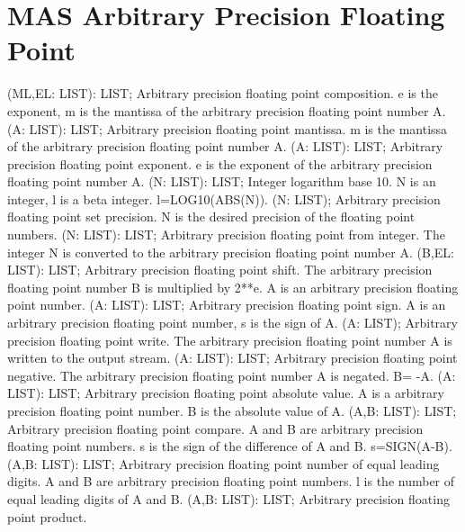 \section{ MAS Arbitrary Precision Floating Point  } 
 (ML,EL: LIST): LIST; \eproc
\bcom Arbitrary precision floating point composition. e is the
exponent, m is the mantissa of the arbitrary precision
floating point number A. \ecom 
{} (A: LIST): LIST; \eproc
\bcom Arbitrary precision floating point mantissa. m is the mantissa
of the arbitrary precision floating point number A. \ecom 
{} (A: LIST): LIST; \eproc
\bcom Arbitrary precision floating point exponent. e is the
exponent of the arbitrary precision floating point number A. \ecom 
{} (N: LIST): LIST; \eproc
\bcom Integer logarithm base 10.
N is an integer, l is a beta integer. l=LOG10(ABS(N)). \ecom 
{} (N: LIST); \eproc
\bcom Arbitrary precision floating point set precision.
N is the desired precision of the floating point numbers. \ecom 
{} (N: LIST): LIST; \eproc
\bcom Arbitrary precision floating point from integer.
The integer N is converted to the arbitrary precision
floating point number A. \ecom 
{} (B,EL: LIST): LIST; \eproc
\bcom Arbitrary precision floating point shift.
The arbitrary precision floating point number B is multiplied by 2**e.
A is an arbitrary precision floating point number. \ecom 
{} (A: LIST): LIST; \eproc
\bcom Arbitrary precision floating point sign. A is an arbitrary precision
floating point number, s is the sign of A. \ecom 
{} (A: LIST); \eproc
\bcom Arbitrary precision floating point write.
The arbitrary precision floating point number A is written to
the output stream. \ecom 
{} (A: LIST): LIST; \eproc
\bcom Arbitrary precision floating point negative.
The arbitrary precision floating point number A is negated.
B= -A. \ecom 
{} (A: LIST): LIST; \eproc
\bcom Arbitrary precision floating point absolute value.
A is a arbitrary precision floating point number.
B is the absolute value of A. \ecom 
{} (A,B: LIST): LIST; \eproc
\bcom Arbitrary precision floating point compare.
A and B are arbitrary precision floating point numbers.
s is the sign of the difference of A and B. s=SIGN(A-B). \ecom 
{} (A,B: LIST): LIST; \eproc
\bcom Arbitrary precision floating point number of equal leading digits.
A and B are arbitrary precision floating point numbers.
l is the number of equal leading digits of A and B. \ecom 
{} (A,B: LIST): LIST; \eproc
\bcom Arbitrary precision floating point product.
